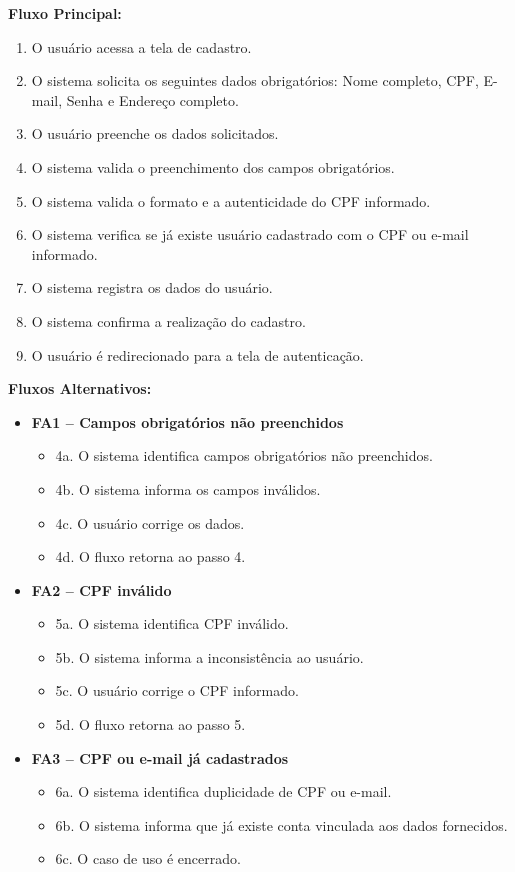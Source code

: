 ﻿\documentclass[12pt,a4paper]{article}
\begin{document}
\vspace{0.5em}
\noindent\textbf{Fluxo Principal:}
\begin{enumerate}[label=\arabic*.]
    \item O usuário acessa a tela de cadastro.
    \item O sistema solicita os seguintes dados obrigatórios: Nome completo, CPF, E-mail, Senha e Endereço completo.
    \item O usuário preenche os dados solicitados.
    \item O sistema valida o preenchimento dos campos obrigatórios.
    \item O sistema valida o formato e a autenticidade do CPF informado.
    \item O sistema verifica se já existe usuário cadastrado com o CPF ou e-mail informado.
    \item O sistema registra os dados do usuário.
    \item O sistema confirma a realização do cadastro.
    \item O usuário é redirecionado para a tela de autenticação.
\end{enumerate}

\vspace{0.5em}
\noindent\textbf{Fluxos Alternativos:}
\begin{itemize}[leftmargin=*]
    \item \textbf{FA1 – Campos obrigatórios não preenchidos}
    \begin{itemize}[label={}, leftmargin=0.5cm]
        \item 4a. O sistema identifica campos obrigatórios não preenchidos.
        \item 4b. O sistema informa os campos inválidos.
        \item 4c. O usuário corrige os dados.
        \item 4d. O fluxo retorna ao passo 4.
    \end{itemize}
    
    \item \textbf{FA2 – CPF inválido}
    \begin{itemize}[label={}, leftmargin=0.5cm]
        \item 5a. O sistema identifica CPF inválido.
        \item 5b. O sistema informa a inconsistência ao usuário.
        \item 5c. O usuário corrige o CPF informado.
        \item 5d. O fluxo retorna ao passo 5.
    \end{itemize}

    \item \textbf{FA3 – CPF ou e-mail já cadastrados}
    \begin{itemize}[label={}, leftmargin=0.5cm]
        \item 6a. O sistema identifica duplicidade de CPF ou e-mail.
        \item 6b. O sistema informa que já existe conta vinculada aos dados fornecidos.
        \item 6c. O caso de uso é encerrado.
    \end{itemize}
\end{itemize}
\end{document}
